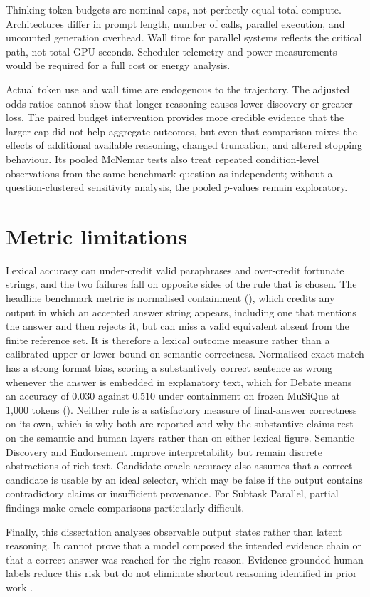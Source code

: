 Thinking-token budgets are nominal caps, not perfectly equal total compute. Architectures differ in prompt length, number of calls, parallel execution, and uncounted generation overhead. Wall time for parallel systems reflects the critical path, not total GPU-seconds. Scheduler telemetry and power measurements would be required for a full cost or energy analysis.

Actual token use and wall time are endogenous to the trajectory. The adjusted odds ratios cannot show that longer reasoning causes lower discovery or greater loss. The paired budget intervention provides more credible evidence that the larger cap did not help aggregate outcomes, but even that comparison mixes the effects of additional available reasoning, changed truncation, and altered stopping behaviour. Its pooled McNemar tests also treat repeated condition-level observations from the same benchmark question as independent; without a question-clustered sensitivity analysis, the pooled $p$-values remain exploratory.

\section{Metric limitations}

Lexical accuracy can under-credit valid paraphrases and over-credit fortunate strings, and the two failures fall on opposite sides of the rule that is chosen. The headline benchmark metric is normalised containment (), which credits any output in which an accepted answer string appears, including one that mentions the answer and then rejects it, but can miss a valid equivalent absent from the finite reference set. It is therefore a lexical outcome measure rather than a calibrated upper or lower bound on semantic correctness. Normalised exact match has a strong format bias, scoring a substantively correct sentence as wrong whenever the answer is embedded in explanatory text, which for Debate means an accuracy of 0.030 against 0.510 under containment on frozen MuSiQue at 1,000 tokens (). Neither rule is a satisfactory measure of final-answer correctness on its own, which is why both are reported and why the substantive claims rest on the semantic and human layers rather than on either lexical figure. Semantic Discovery and Endorsement improve interpretability but remain discrete abstractions of rich text. Candidate-oracle accuracy also assumes that a correct candidate is usable by an ideal selector, which may be false if the output contains contradictory claims or insufficient provenance. For Subtask Parallel, partial findings make oracle comparisons particularly difficult.

Finally, this dissertation analyses observable output states rather than latent reasoning. It cannot prove that a model composed the intended evidence chain or that a correct answer was reached for the right reason. Evidence-grounded human labels reduce this risk but do not eliminate shortcut reasoning identified in prior work \citep{min2019compositional}.
